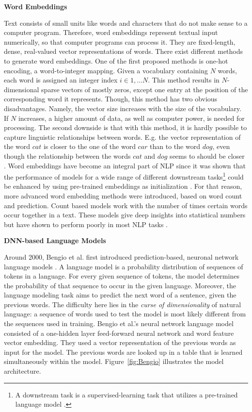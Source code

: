  
\textbf{Word Embeddings}
    \label{sec:word_embeddings}

Text consists of small units like words and characters that do not make sense to a computer program. Therefore, word embeddings represent textual input numerically, so that computer programs can process it. They are fixed-length, dense, real-valued vector representations of words.
There exist different methods to generate word embeddings. One of the first proposed methods is one-hot encoding, a word-to-integer mapping. Given a vocabulary containing $N$ words, each word is assigned an integer index $i \in {1, \dots N}$. 
This method results in $N$-dimensional sparse vectors of mostly zeros, except one entry at the position of the corresponding word it represents. Though, this method has two obvious disadvantages. Namely, the vector size increases with the size of the vocabulary. If $N$ increases, a higher amount of data, as well as computer power, is needed for processing. The second downside is that with this method, it is hardly possible to capture linguistic relationships between words. E.g. the vector representation of the word $cat$ is closer to the one of the word $car$ than to the word $dog$, even though the relationship between the words $cat$ and $dog$ seems to should be closer \cite{rodriguez2018beyond}.
Word embeddings have become an integral part of NLP since it was shown that the performance of models for a wide range of different downstream tasks\footnote{A downstream task is a supervised-learning task that utilizes a pre-trained language model \cite{alammar2018illustrated}.} could be enhanced by using pre-trained embeddings as initialization \cite{mikolov2013efficient, pennington2014glove}. 
For that reason, more advanced word embedding methods were introduced, based on word count and prediction. Count based models work with the number of times certain words occur together in a text. These models give deep insights into statistical numbers but have shown to perform poorly in most NLP tasks \cite{neubig2016generalizing}.

 
\textbf{DNN-based Language Models}
    \label{sec:DNN-based_Language_models}
    
Around 2000, Bengio et al. first introduced prediction-based, neuronal network language models \cite{bengio2003neural}. A language model is a probability distribution of sequences of tokens in a language. For every given sequence of tokens, the model determines the probability of that sequence to occur in the given language. Moreover, the language modeling task aims to predict the next word of a sentence, given the previous words. The difficulty here lies in the \textit{curse of dimensionality} of natural language: a sequence of words used to test the model is most likely different from the sequences used in training.  Bengio et al.'s neural network language model consisted of a one-hidden layer feed-forward neural network and word feature vector embedding.
They used a vector representation of the previous words as input for the model. The previous words are looked up in a table that is learned simultaneously within the model. 
Figure~\ref{fig:Bengio} illustrates the model architecture.


